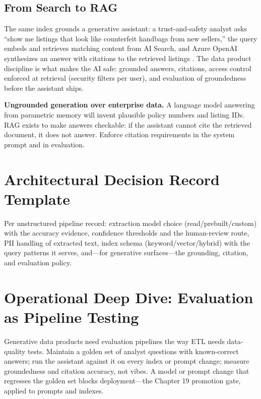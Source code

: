 \subsection{From Search to RAG}
The same index grounds a generative assistant: a trust-and-safety analyst asks ``show me listings that look like counterfeit handbags from new sellers,'' the query embeds and retrieves matching content from AI Search, and Azure OpenAI synthesizes an answer with citations to the retrieved listings \cite{microsoft2025azureOpenAI}. The data product discipline is what makes the AI safe: grounded answers, citations, access control enforced at retrieval (security filters per user), and evaluation of groundedness before the assistant ships.

\begin{pitfall}
\textbf{Ungrounded generation over enterprise data.} A language model answering from parametric memory will invent plausible policy numbers and listing IDs. RAG exists to make answers checkable: if the assistant cannot cite the retrieved document, it does not answer. Enforce citation requirements in the system prompt and in evaluation.
\end{pitfall}

\section{Architectural Decision Record Template}
Per unstructured pipeline record: extraction model choice (read/prebuilt/custom) with the accuracy evidence, confidence thresholds and the human-review route, PII handling of extracted text, index schema (keyword/vector/hybrid) with the query patterns it serves, and---for generative surfaces---the grounding, citation, and evaluation policy.

\section{Operational Deep Dive: Evaluation as Pipeline Testing}
Generative data products need evaluation pipelines the way ETL needs data-quality tests. Maintain a golden set of analyst questions with known-correct answers; run the assistant against it on every index or prompt change; measure groundedness and citation accuracy, not vibes. A model or prompt change that regresses the golden set blocks deployment---the Chapter 19 promotion gate, applied to prompts and indexes.

